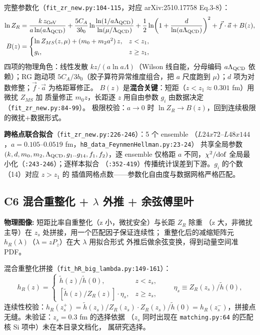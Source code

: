 \documentclass[UTF8]{ctexart}
\begin{document}
完整参数化（\texttt{fit\_zr\_new.py:104-115}，对应 arXiv:2510.17758 Eq.3-8）：
\begin{align}\label{eq:zr}
\ln Z_R &= \frac{k\, z_{\rm GeV}}{a\ln(a\Lambda_{\rm QCD})}
+ \frac{5C_A}{3b_0}\ln\!\frac{\ln(1/a\Lambda_{\rm QCD})}{\ln(\mu/\Lambda_{\rm QCD})}
+ \frac{1}{2}\ln\!\left(1+\frac{d}{\ln(a\Lambda_{\rm QCD})}\right)^2
+ \vec f\cdot\vec a + B(z),\\
B(z) &= \begin{cases}
\ln Z_{MS}(z,\mu) + (m_0 + m_2 a^2)\,z, & z < z_1,\\[2pt]
g_i, & z \ge z_1,
\end{cases}\label{eq:bz}
\end{align}
四项的物理角色：线性发散 $k z/(a\ln a\Lambda)$（Wilson 线自能，分母编码
$a\Lambda_{\rm QCD}$ 依赖）；RG 跑动项 $5C_A/3b_0$（胶子算符异常维度组合，把
$a$ 尺度跑到 $\mu$）；$d$ 项为对数修整；$\vec f\cdot\vec a$ 为格距幂修正。
$B(z)$ 是\textbf{混合关键}：短距（$z<z_1\approx0.301$ fm）用微扰 $Z_{MS}$ 加
质量修正 $m_0 z$，长距逐 $z$ 用自由参数 $g_i$ 由数据决定（\texttt{fit\_zr\_new.py:84-99}）。
极限校验：$a\to0$ 时 $\ln Z_R\to B(z)$，回到连续极限的微扰+数据形式。

\textbf{跨格点联合拟合}（\texttt{fit\_zr\_new.py:226-246}）：5 个 ensemble
（$L24x72$--$L48x144$，$a=0.105$--$0.0519$ fm，\texttt{hB\_data\_FeynmenHellman.py:23-24}）
共享全局参数 $(k,d,m_0,m_2,\Lambda_{\rm QCD},g_1..g_{14},f_1,f_2)$，逐 ensemble
仅格距 $a$ 不同，$\chi^2/{\rm dof}$ 全局最小化（\texttt{:243-246}）；逐样本拟合
（\texttt{:352-419}）传播统计误差到下游。$g_i$ 的个数（14）对应 $z>z_1$ 的
插值网格点数——参数化自由度与数据网格严格匹配。

\subsection{C6 混合重整化 + $\lambda$ 外推 + 余弦傅里叶}

\begin{physbox}
\textbf{物理图像:} 短距比率自重整化（z 小，微扰安全）与长距 $Z_R$ 除重
（z 大，非微扰主导）在 $z_s$ 处拼接，用一个匹配因子保证连续性；
重整化后的减缩矩阵元 $h_R(\lambda)$（$\lambda=zP_z$）在大 $\lambda$ 用拟合形式
外推后做余弦变换，得到动量空间准 PDF。
\end{physbox}

混合重整化拼接（\texttt{fit\_hR\_big\_lambda.py:149-161}）：
\begin{equation}\label{eq:hybrid}
h_R(z) = \begin{cases}
\tilde h(z)/\tilde h(0), & z < z_s,\\[2pt]
\left[\tilde h(z)/Z_R(z)\right]\cdot \eta_s, & z \ge z_s,
\end{cases}\qquad
\eta_s \equiv Z_R(z_s)/\tilde h(0),
\end{equation}
连续性校验：$h_R(z_s^+) = \tilde h(z_s)/Z_R(z_s)\cdot Z_R(z_s)/\tilde h(0)
= h_R(z_s^-)$，拼接点无缝。\textcolor{warn}{未验证}：$z_s=0.3$ fm 的选择依据
（$z_s$ 同时出现在 \texttt{matching.py:64} 的匹配核 Si 项中）未在本目录文档化，
属研究选择。
\end{document}
